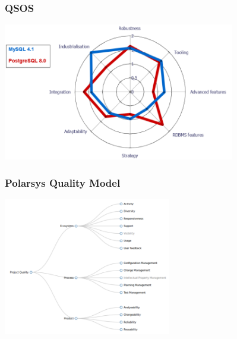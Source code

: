 \documentclass[17pt,aspectratio=169,hyperref=pdfusetitle]{beamer}
\begin{document}
\begin{frame}[fragile]
  \frametitle{QSOS}

  \begin{center}
  \includegraphics[height=6cm]{figs/qsos-example}
  \end{center}  

\end{frame}




\begin{frame}[fragile]
  \frametitle{Polarsys Quality Model}

  \begin{center}
  \includegraphics[height=6cm]{figs/polarsys-attributes}
  \end{center}  
  
\end{frame}
\end{document}
